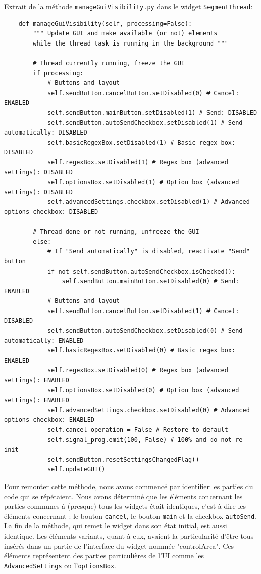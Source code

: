 \documentclass{article}
\begin{document}
Extrait de la méthode \texttt{manageGuiVisibility.py} dans le widget \texttt{SegmentThread}:

\begin{verbatim}
    def manageGuiVisibility(self, processing=False):
        """ Update GUI and make available (or not) elements
        while the thread task is running in the background """

        # Thread currently running, freeze the GUI
        if processing:
            # Buttons and layout
            self.sendButton.cancelButton.setDisabled(0) # Cancel: ENABLED
            self.sendButton.mainButton.setDisabled(1) # Send: DISABLED
            self.sendButton.autoSendCheckbox.setDisabled(1) # Send automatically: DISABLED
            self.basicRegexBox.setDisabled(1) # Basic regex box: DISABLED
            self.regexBox.setDisabled(1) # Regex box (advanced settings): DISABLED
            self.optionsBox.setDisabled(1) # Option box (advanced settings): DISABLED
            self.advancedSettings.checkbox.setDisabled(1) # Advanced options checkbox: DISABLED

        # Thread done or not running, unfreeze the GUI
        else:
            # If "Send automatically" is disabled, reactivate "Send" button
            if not self.sendButton.autoSendCheckbox.isChecked():
                self.sendButton.mainButton.setDisabled(0) # Send: ENABLED
            # Buttons and layout
            self.sendButton.cancelButton.setDisabled(1) # Cancel: DISABLED
            self.sendButton.autoSendCheckbox.setDisabled(0) # Send automatically: ENABLED
            self.basicRegexBox.setDisabled(0) # Basic regex box: ENABLED
            self.regexBox.setDisabled(0) # Regex box (advanced settings): ENABLED
            self.optionsBox.setDisabled(0) # Option box (advanced settings): ENABLED
            self.advancedSettings.checkbox.setDisabled(0) # Advanced options checkbox: ENABLED
            self.cancel_operation = False # Restore to default
            self.signal_prog.emit(100, False) # 100% and do not re-init
            self.sendButton.resetSettingsChangedFlag()
            self.updateGUI()
\end{verbatim}

Pour remonter cette méthode, nous avons commencé par identifier les parties du code qui se répétaient. Nous avons déterminé que les éléments concernant les parties communes à (presque) tous les widgets était identiques, c'est à dire les éléments concernant : le bouton \texttt{cancel}, le bouton \texttt{main} et la checkbox \texttt{autoSend}. La fin de la méthode, qui remet le widget dans son état initial, est aussi identique.
Les éléments variants, quant à eux, avaient la particularité d'être tous insérés dans un partie de l'interface du widget nommée "controlArea". Ces éléments représentent des parties particulières de l'UI comme les \texttt{AdvancedSettings} ou l'\texttt{optionsBox}. 
\end{document}

